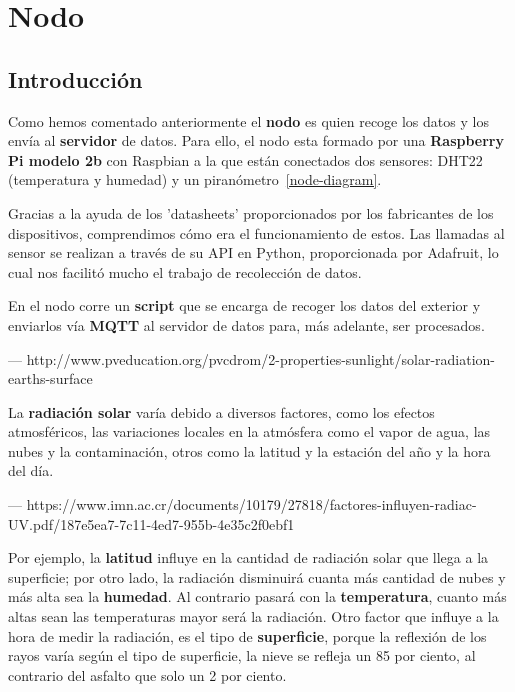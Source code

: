 \cleardoublepage

\chapter{Nodo}
\label{makereference4}

\section{Introducción}
\label{makereference4.1}

Como hemos comentado anteriormente el \textbf{nodo} es quien recoge los datos y los envía al \textbf{servidor} de datos.
Para ello, el nodo esta formado por una \textbf{Raspberry Pi modelo 2b} con Raspbian a la que están conectados dos sensores: DHT22 (temperatura y humedad) y un piranómetro~\ref{node-diagram}.

Gracias a la ayuda de los 'datasheets' proporcionados por los fabricantes de los dispositivos, comprendimos cómo era el funcionamiento de estos. 
Las llamadas al sensor se realizan a través de su API en Python, proporcionada por Adafruit, lo cual nos facilitó mucho el trabajo de recolección de datos.

En el nodo corre un \textbf{script} que se encarga de recoger los datos del exterior y enviarlos vía \textbf{MQTT} al servidor de datos para, más adelante, ser procesados.

--- http://www.pveducation.org/pvcdrom/2-properties-sunlight/solar-radiation-earths-surface

La \textbf{radiación solar} varía debido a diversos factores, como los efectos atmosféricos, las variaciones locales en la atmósfera como el vapor de agua, las nubes y la contaminación, otros como la latitud y la estación del año y la hora del día.

--- https://www.imn.ac.cr/documents/10179/27818/factores-influyen-radiac-UV.pdf/187e5ea7-7c11-4ed7-955b-4e35c2f0ebf1

Por ejemplo, la \textbf{latitud} influye en la cantidad de radiación solar que llega a la superficie; por otro lado, la radiación disminuirá cuanta más cantidad de nubes y más alta sea la \textbf{humedad}. Al contrario pasará con la \textbf{temperatura}, cuanto más altas sean las temperaturas mayor será la radiación. Otro factor que influye a la hora de medir la radiación, es el tipo de \textbf{superficie}, porque la reflexión de los rayos varía según el tipo de superficie, la nieve se refleja un 85 por ciento, al contrario del asfalto que solo un 2 por ciento.

